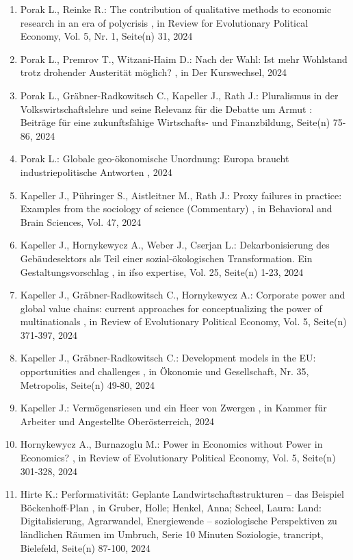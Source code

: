 \begin{enumerate}[leftmargin=*, labelsep=0.5cm]
	 \item Porak L., Reinke R.:  The contribution of qualitative methods to economic research in an era of polycrisis  , in Review for Evolutionary Political Economy, Vol. 5, Nr. 1, Seite(n) 31, 2024
	 \item Porak L., Premrov T., Witzani-Haim D.:  Nach der Wahl: Ist mehr Wohl­stand trotz dro­hen­der Aus­teri­tät möglich?  , in Der Kurswechsel, 2024
	 \item Porak L., Gräbner-Radkowitsch C., Kapeller J., Rath J.:  Pluralismus in der Volkswirtschaftslehre und seine Relevanz für die Debatte um Armut  : Beiträge für eine zukunftsfähige Wirtschafts- und Finanzbildung, Seite(n) 75-86, 2024
	 \item Porak L.:  Globale geo-ökonomische Unordnung: Europa braucht industriepolitische Antworten  , 2024
	 \item Kapeller J., Pühringer S., Aistleitner M., Rath J.:  Proxy failures in practice: Examples from the sociology of science (Commentary)  , in Behavioral and Brain Sciences, Vol. 47, 2024
	 \item Kapeller J., Hornykewycz A., Weber J., Cserjan L.:  Dekarbonisierung des Gebäudesektors als Teil einer sozial-ökologischen Transformation. Ein Gestaltungsvorschlag  , in ifso expertise, Vol. 25, Seite(n) 1-23, 2024
	 \item Kapeller J., Gräbner-Radkowitsch C., Hornykewycz A.:  Corporate power and global value chains: current approaches for conceptualizing the power of multinationals  , in Review of Evolutionary Political Economy, Vol. 5, Seite(n) 371-397, 2024
	 \item Kapeller J., Gräbner-Radkowitsch C.:  Development models in the EU:  opportunities and challenges  , in Ökonomie und Gesellschaft, Nr. 35, Metropolis, Seite(n) 49-80, 2024
	 \item Kapeller J.:  Vermögensriesen und ein Heer von Zwergen  , in Kammer für Arbeiter und Angestellte Oberösterreich, 2024
	 \item Hornykewycz A., Burnazoglu M.:  Power in Economics without Power in Economics?  , in Review of Evolutionary Political Economy, Vol. 5, Seite(n) 301-328, 2024
	 \item Hirte K.:  Performativität: Geplante Landwirtschaftsstrukturen – das Beispiel Böckenhoff-Plan  , in Gruber, Holle; Henkel, Anna; Scheel, Laura: Land: Digitalisierung, Agrarwandel, Energiewende – soziologische Perspektiven zu ländlichen Räumen im Umbruch, Serie 10 Minuten Soziologie, trancript, Bielefeld, Seite(n) 87-100, 2024

\end{enumerate}
